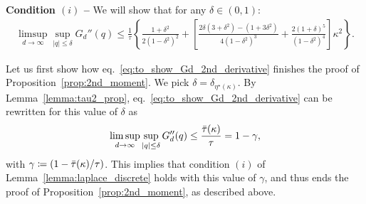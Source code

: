 \myskip
\textbf{Condition $(i)$ --}
We will show that for any $\delta \in (0,1)$:
\begin{align}\label{eq:to_show_Gd_2nd_derivative}
    \limsup_{d \to \infty}\sup_{|q| \leq \delta} G_d''(q) \leq 
    \frac{1}{\tau} \left\{\frac{1+\delta^2}{2(1-\delta^2)^2}
      + \left[\frac{2 \delta(3+\delta^2) - (1+3 \delta^2)}{4(1-\delta^2)^3} + \frac{2(1+\delta)^5}{(1-\delta^2)^4}\right] \kappa^2\right\}.
\end{align}

\myskip
Let us first show how eq.~\eqref{eq:to_show_Gd_2nd_derivative} finishes the proof of Proposition~\ref{prop:2nd_moment}. 
We pick $\delta = \delta_{\eta^\star(\kappa)}$. 
By Lemma~\ref{lemma:tau2_prop}, eq.~\eqref{eq:to_show_Gd_2nd_derivative} can be rewritten for this value of $\delta$ 
as 
\begin{align*}
    \limsup_{d \to \infty}\sup_{|q| \leq \delta} G_d''(q) \leq 
    \frac{{\bar{\tau}}(\kappa)}{\tau} = 1 - \gamma,
\end{align*}
with $\gamma \coloneqq (1 - {\bar{\tau}}(\kappa)/\tau)$.
This implies that condition $(i)$ of Lemma~\ref{lemma:laplace_discrete} holds with this value of $\gamma$, 
and thus ends the proof of Proposition~\ref{prop:2nd_moment}, as described above.

